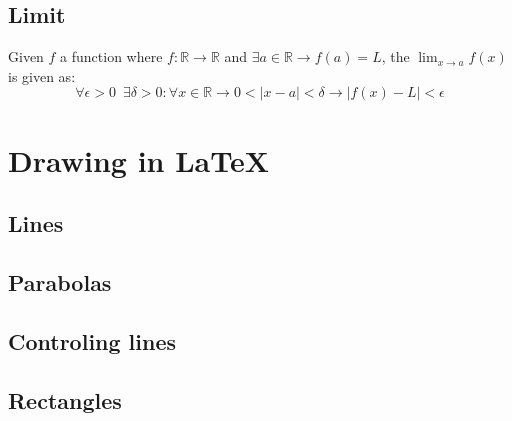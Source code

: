 \documentclass{article}
\begin{document}
    \subsection{Limit}
    Given $f$ a function where $f:\mathbb{R} \rightarrow \mathbb{R}$ and $\exists a \in\mathbb{R} \rightarrow f(a) = L$, the $\lim_{x\to a} f(x)$ is given as: 
    \begin{equation}
        \forall\epsilon > 0 \;\: \exists\delta > 0 : \forall x \in\mathbb{R} \rightarrow
        0 < |x - a| < \delta \rightarrow |f(x) - L| < \epsilon
    \end{equation}

    \newpage

    \section{Drawing in \LaTeX{}}
    \subsection{Lines}


    \subsection{Parabolas}


    \subsection{Controling lines}

    \subsection{Rectangles}
\end{document}

